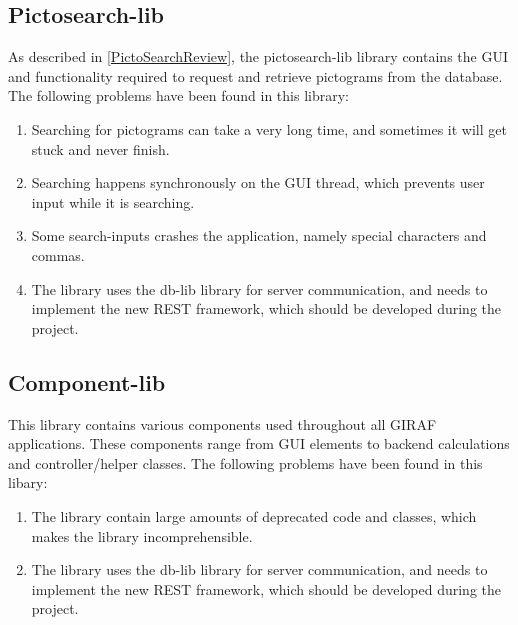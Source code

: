 \subsection{Pictosearch-lib}
As described in \autoref{PictoSearchReview}, the pictosearch-lib library
contains the GUI and functionality required to request and retrieve pictograms
from the database. The following problems have been found in this library:
\begin{enumerate}
  \item Searching for pictograms can take a very long time, and sometimes it
  will get stuck and never finish.
  \item Searching happens synchronously on the GUI thread, which prevents user
  input while it is searching.
  \item Some search-inputs crashes the application, namely special characters
  and commas.
  \item The library uses the db-lib library for server communication, and needs
  to implement the new REST framework, which should be developed during the project.
\end{enumerate}

\subsection{Component-lib}
This library contains various components used throughout all GIRAF applications.
These components range from GUI elements to backend calculations and
controller/helper classes. The following problems have been found in this
libary:
\begin{enumerate}
  \item The library contain large amounts of deprecated code and classes, which
  makes the library incomprehensible.
  \item The library uses the db-lib library for server communication, and needs
  to implement the new REST framework, which should be developed during the project.
\end{enumerate}